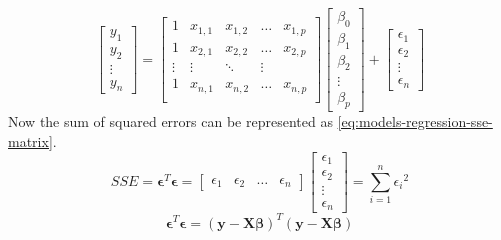 \begin{equation}\label{eq:models-regression-matrix}
    \begin{bmatrix}
        y_1 \\
        y_2 \\
        \vdots \\
        y_n
    \end{bmatrix}
    =
    \begin{bmatrix}
        1 & x_{1, 1} & x_{1, 2} & \hdots & x_{1, p} \\
        1 & x_{2, 1} & x_{2, 2} & \hdots & x_{2, p} \\
        \vdots   & \vdots   & \ddots & \vdots   \\
        1 & x_{n, 1} & x_{n, 2} & \hdots & x_{n, p} \\
    \end{bmatrix}
    \begin{bmatrix}
        {\beta}_0 \\
        {\beta}_1 \\
        {\beta}_2 \\
        \vdots \\
        {\beta}_p
    \end{bmatrix}
    +
    \begin{bmatrix}
        {\epsilon}_1 \\
        {\epsilon}_2 \\
        \vdots \\
        {\epsilon}_n
    \end{bmatrix}
\end{equation}
Now the sum of squared errors can be represented as \ref{eq:models-regression-sse-matrix}.
\begin{equation}\label{eq:models-regression-sse-matrix}
    SSE =
    \bm{\epsilon}^T \bm{\epsilon} = 
    \begin{bmatrix}
        {\epsilon}_1 & {\epsilon}_2 & \hdots & {\epsilon}_n
    \end{bmatrix}
    \begin{bmatrix}
        {\epsilon}_1 \\
        {\epsilon}_2 \\
        \vdots \\
        {\epsilon}_n
    \end{bmatrix}
    = \sum_{i = 1}^{n} {{\epsilon}_i}^2
\end{equation}
\begin{equation}
    \bm{\epsilon}^T \bm{\epsilon} = (\bm{y} - \bm{X}\bm{\beta})^T (\bm{y} - \bm{X}\bm{\beta})
\end{equation}
